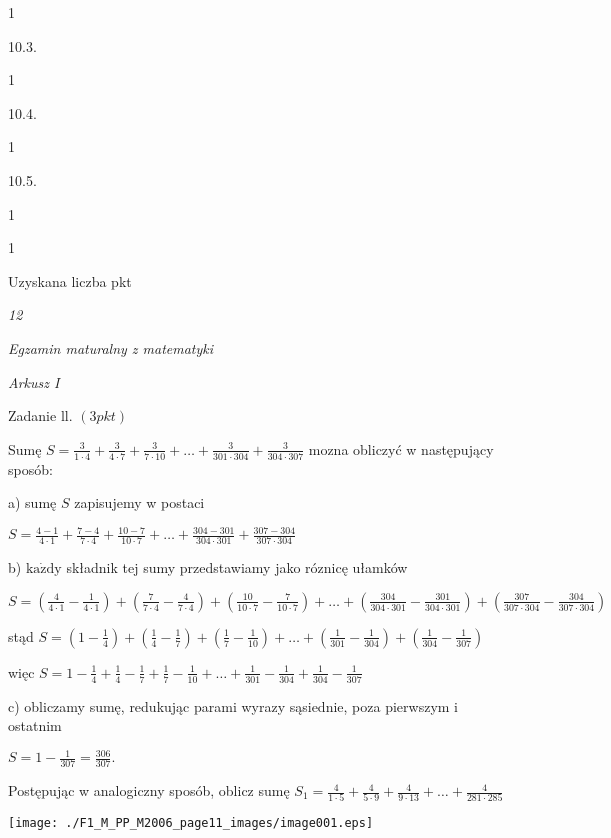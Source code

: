 \documentclass[a4paper,12pt]{article}
\begin{document}
1

10.3.

1

10.4.

1

10.5.

1

1

Uzyskana liczba pkt





{\it 12}

{\it Egzamin maturalny z matematyki}

{\it Arkusz I}

Zadanie ll. $(3pkt)$

Sumę $S=\displaystyle \frac{3}{1\cdot 4}+\frac{3}{4\cdot 7}+\frac{3}{7\cdot 10}+\ldots+\frac{3}{301\cdot 304}+\frac{3}{304\cdot 307}$ mozna obliczyć w następujący sposób:

a) sumę $S$ zapisujemy w postaci

$S=\displaystyle \frac{4-1}{4\cdot 1}+\frac{7-4}{7\cdot 4}+\frac{10-7}{10\cdot 7}+\ldots+\frac{304-301}{304\cdot 301}+\frac{307-304}{307\cdot 304}$

b) $\mathrm{k}\mathrm{a}\dot{\mathrm{z}}\mathrm{d}\mathrm{y}$ składnik tej sumy przedstawiamy jako róznicę ułamków

$S=(\displaystyle \frac{4}{4\cdot 1}-\frac{1}{4\cdot 1})+(\frac{7}{7\cdot 4}-\frac{4}{7\cdot 4})+(\frac{10}{10\cdot 7}-\frac{7}{10\cdot 7})+\ldots+(\frac{304}{304\cdot 301}-\frac{301}{304\cdot 301})+(\frac{307}{307\cdot 304}-\frac{304}{307\cdot 304})$

stąd $S=(1-\displaystyle \frac{1}{4})+(\frac{1}{4}-\frac{1}{7})+(\frac{1}{7}-\frac{1}{10})+\ldots+(\frac{1}{301}-\frac{1}{304})+(\frac{1}{304}-\frac{1}{307})$

więc $S=1-\displaystyle \frac{1}{4}+\frac{1}{4}-\frac{1}{7}+\frac{1}{7}-\frac{1}{10}+\ldots+\frac{1}{301}-\frac{1}{304}+\frac{1}{304}-\frac{1}{307}$

c) obliczamy sumę, redukując parami wyrazy sąsiednie, poza pierwszym i ostatnim

$S=1-\displaystyle \frac{1}{307}=\frac{306}{307}.$

Postępując w analogiczny sposób, oblicz sumę $S_{1}=\displaystyle \frac{4}{1\cdot 5}+\frac{4}{5\cdot 9}+\frac{4}{9\cdot 13}+\ldots+\frac{4}{281\cdot 285}$
\begin{center}
\texttt{[image: ./F1\_M\_PP\_M2006\_page11\_images/image001.eps]}
\end{center}
\end{document}
